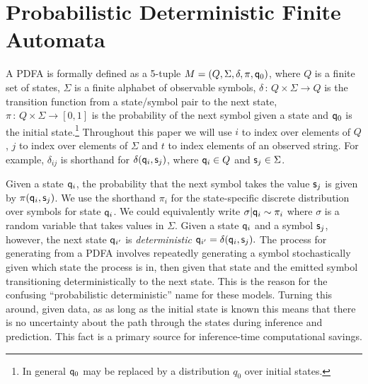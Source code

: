 \section{Probabilistic Deterministic Finite Automata}
\label{sec:PDFA}

A PDFA is formally defined as a 5-tuple $M = (Q,\Sigma,\delta,\pi,\state_0)$, where $Q$ is a finite set of states, $\Sigma$ is a finite alphabet of observable symbols, $\delta\,:\,Q\times\Sigma\rightarrow Q$ is the transition function from a state/symbol pair to the next state, $\pi\,:\,Q\times\Sigma\rightarrow[0,1]$ is the probability of the next symbol given a state and $\q_0$ is the initial state.\footnote{In general $\state_0$ may be replaced by a distribution $q_0$ over initial states.  }  Throughout this paper we will use $i$ to index over elements of $Q$, $j$ to index over elements of $\Sigma$ and $t$ to index elements of an observed string.  For example, $\delta_{ij}$ is shorthand for $\delta(\state_i,\symb_j)$, where $\state_i \in Q$ and $\symb_j \in \Sigma$.

Given a state $\state_i$, the probability that the next symbol takes the value $\symb_j$ is given by $\pi(\state_i,\symb_j)$.  We use the shorthand $\pi_i$ for the state-specific discrete distribution over symbols for state $\state_i$.  We could equivalently write $\sigma|\state_i \sim \pi_i$ where $\sigma$ is a random variable that takes values in $\Sigma$.  Given a state $\state_i$ and a symbol $\symb_j$, however, the next state $\state_{i'}$ is {\it deterministic} $\state_{i'} = \delta(\state_i,\symb_j).$   The process for generating from a PDFA involves repeatedly generating a symbol stochastically given which state the process is in, then given that state and the emitted symbol transitioning deterministically to the next state.  This is the reason for the confusing ``probabilistic deterministic'' name for these models.  Turning this around, given data, as as long as the initial state is known this means that there is no uncertainty about the path through the states during inference and prediction. 
This fact is a primary source for inference-time computational savings.

